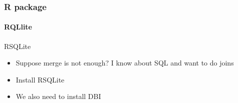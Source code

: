 \documentclass[12pt]{beamer}\usepackage[]{graphicx}\usepackage[]{color}
\makeatletter
\newenvironment{kframe}{%
 \def\at@end@of@kframe{}%
 \ifinner\ifhmode%
  \def\at@end@of@kframe{\end{minipage}}%
  \begin{minipage}{\columnwidth}%
 \fi\fi%
 \def\FrameCommand##1{\hskip\@totalleftmargin \hskip-\fboxsep
 \colorbox{shadecolor}{##1}\hskip-\fboxsep
     \hskip-\linewidth \hskip-\@totalleftmargin \hskip\columnwidth}%
 \MakeFramed {\advance\hsize-\width
   \@totalleftmargin\z@ \linewidth\hsize
   \@setminipage}}%
 {\par\unskip\endMakeFramed%
 \at@end@of@kframe}
\newenvironment{knitrout}{}{} %
\makeatother
\begin{document}
\begin{frame}[fragile]
  \frametitle{R package}
  \framesubtitle{RQLlite}
  \begin{block}{RSQLite}
  \begin{itemize}
  \item Suppose merge is not enough? I know about SQL and want to do joins
  \item Install RSQLite
  \item We also need to install DBI
  \end{itemize}
  \end{block}
\begin{knitrout}
\color{fgcolor}\begin{kframe}


{\ttfamily\noindent\itshape\color{messagecolor}{\#\# Loading required package: RSQLite}}\end{kframe}
\end{knitrout}


\end{frame}
\end{document}
